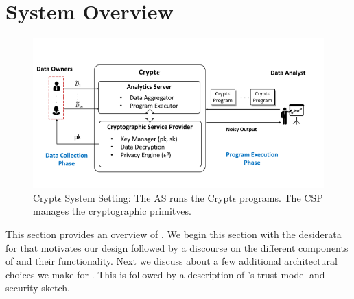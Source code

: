 \section{System Overview}\label{sec:overview}

\begin{figure}
\includegraphics[width=\columnwidth]{diag.png}\caption{ Crypt$\epsilon$ System Setting: The  \textsf{AS} runs the Crypt$\epsilon$ programs. The \textsf{CSP} manages the cryptographic primitves. } \end{figure}
This section provides an overview of \system. We begin this section with the desiderata for \system that motivates our design followed by a discourse on the different components of \system and their functionality. Next we discuss about a few additional architectural choices we make for \system. This is followed by a description of \system's trust model and security sketch.

